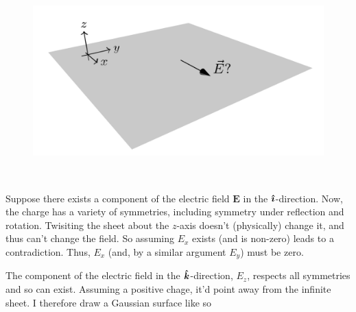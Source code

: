 \documentclass{article}
\begin{document}
\begin{minipage}{0.3\textwidth}
\begin{figure}[H]
\centering
\includegraphics[width=\textwidth]{figures/2l6.png}
\end{figure}
\end{minipage}
~
\begin{minipage}{0.6\textwidth}
Suppose there exists a component of the electric field $\bm{E}$ in the $\bm{\hat{\imath}}$-direction. Now, the charge has a variety of symmetries, including symmetry under reflection and rotation. Twisiting the sheet about the $z$-axis doesn't (physically) change it, and thus can't change the field. So assuming $E_x$ exists (and is non-zero) leads to a contradiction. Thus, $E_x$ (and, by a similar argument $E_y$) must be zero.
\end{minipage}

\vspace{1em}

The component of the electric field in the $\bm{\hat{k}}$-direction, $E_z$, respects all symmetries and so can exist. Assuming a positive chage, it'd point away from the infinite sheet. I therefore draw a Gaussian surface like so

\vspace{1em}
\end{document}
